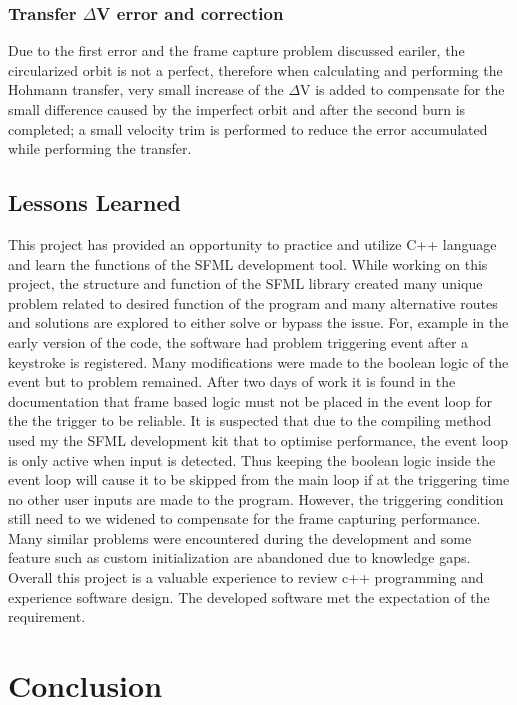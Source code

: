 \documentclass[12pt, letter]{article}
\begin{document}
\subsubsection{Transfer $\Delta$V error and correction}
    Due to the first error and the frame capture problem discussed eariler, the circularized orbit is not a perfect, therefore when calculating and performing the Hohmann transfer, very small increase of the $\Delta$V is added to compensate for the small difference caused by the imperfect orbit and after the second burn is completed; a small velocity trim is performed to reduce the error accumulated while performing the transfer.



\subsection{Lessons Learned}
This project has provided an opportunity to practice and utilize C++ language and learn the functions of the SFML development tool.  While working on this project, the structure and function of the SFML library created many unique problem related to desired function of the program and many alternative routes and solutions are explored to either solve or bypass the issue. 
For, example in the early version of the code, the software had problem triggering event after a keystroke is registered. Many modifications were made to the boolean logic of the event but to problem remained. After two days of work it is found in the documentation that frame based logic must not be placed in the event loop for the the trigger to be reliable. It is suspected that due to the compiling method used my the SFML development kit that to optimise performance, the event loop is only active when input is detected. Thus keeping the boolean logic inside the event loop will cause it to be skipped from the main loop if at the triggering time no other user inputs are made to the program. However, the triggering condition still need to we widened to compensate for the frame capturing performance.
Many similar problems were encountered during the development and some feature such as custom initialization are abandoned due to knowledge gaps. Overall this project is a valuable experience to review c++ programming and experience software design. The developed software met the expectation of the requirement.

\clearpage

\section{Conclusion}
\end{document}
